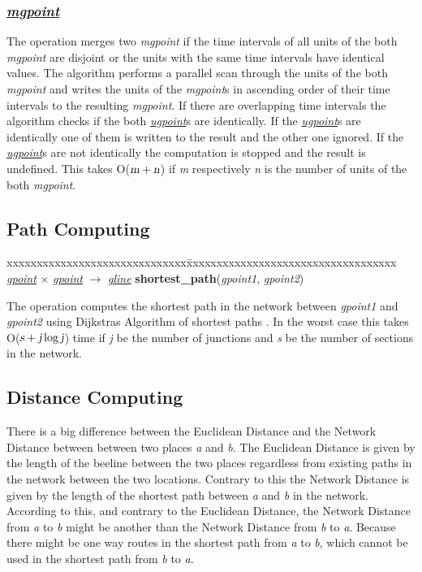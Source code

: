 \documentclass[a4paper]{article}
\newcommand{\op}[1]{\textbf{#1}}
\newcommand{\var}[1]{\textsl{#1}}
\newcommand{\dt}[1]{\textsl{\underline{#1}}}
\begin{document}
\subsubsection{\dt{mgpoint}}
The operation merges two \var{mgpoint} if the time intervals of all units of the both \var{mgpoint} are disjoint or the units with the same time intervals have identical values. 
The algorithm performs a parallel scan through the units of the both \var{mgpoint} and writes the units of the \var{mgpoint}s in ascending order of their time intervals to the resulting \var{mgpoint}. If there are overlapping time intervals the algorithm checks if the both \dt{ugpoint}s are identically. If the \dt{ugpoint}s are identically one of them is written to the result and the other one ignored. If the \dt{ugpoint}s are not identically the computation is stopped and the result is undefined.
This takes O($\var{m}+\var{n}$) if \var{m} respectively \var{n} is the number of units of the both \var{mgpoint}.
\subsection{Path Computing}
\label{sec:shortestpath}
\begin{tabbing}
xxxxxxxxxxxxxxxxxxxxxxxxxxxxxx\=xxxxxxxxxxxxxxxxxxxxxxxxxxxxxxxxxxx\kill
\dt{gpoint} $\times$ \dt{gpoint} $\rightarrow$ \dt{gline} \> \op{shortest\_path}(\var{gpoint1}, \var{gpoint2})
\end{tabbing}
The operation computes the shortest path in the network between \var{gpoint1} and \var{gpoint2} using Dijkstras Algorithm of shortest paths \cite{dijkstra}. In the worst case this takes O($\var{s} + \var{j} \log \var{j}$) time if \var{j} be the number of junctions and \var{s} be the number of sections in the network.
\subsection{Distance Computing}
There is a big difference between the Euclidean Distance and the Network Distance between between two places \var{a} and \var{b}. The Euclidean Distance is given by the length of the beeline between the two places regardless from existing paths in the network between the two locations. Contrary to this the Network Distance is given by the length of the shortest path between \var{a} and \var{b} in the network. According to this, and contrary to the Euclidean Distance, the Network Distance from \var{a} to \var{b} might be another than the Network Distance from \var{b} to \var{a}. Because there might be one way routes in the shortest path from \var{a} to \var{b}, which cannot be used in the shortest path from \var{b} to \var{a}.
\end{document}
